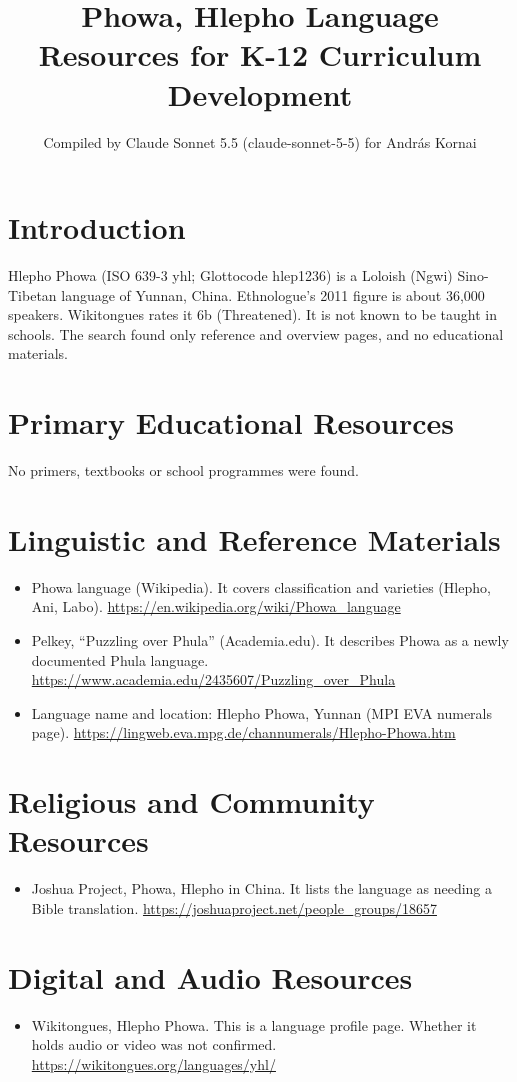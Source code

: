\documentclass[12pt]{article}
\title{Phowa, Hlepho Language Resources for K-12 Curriculum Development}
\author{Compiled by Claude Sonnet 5.5 (claude-sonnet-5-5) for Andr\'as Kornai}
\date{}
\begin{document}
\maketitle

\section{Introduction}
Hlepho Phowa (ISO 639-3 yhl; Glottocode hlep1236) is a Loloish (Ngwi) Sino-Tibetan language of Yunnan, China. Ethnologue's 2011 figure is about 36,000 speakers. Wikitongues rates it 6b (Threatened). It is not known to be taught in schools. The search found only reference and overview pages, and no educational materials.

\section{Primary Educational Resources}
No primers, textbooks or school programmes were found.

\section{Linguistic and Reference Materials}
\begin{itemize}
\item Phowa language (Wikipedia). It covers classification and varieties (Hlepho, Ani, Labo). \url{https://en.wikipedia.org/wiki/Phowa_language}
\item Pelkey, ``Puzzling over Phula'' (Academia.edu). It describes Phowa as a newly documented Phula language. \url{https://www.academia.edu/2435607/Puzzling_over_Phula}
\item Language name and location: Hlepho Phowa, Yunnan (MPI EVA numerals page). \url{https://lingweb.eva.mpg.de/channumerals/Hlepho-Phowa.htm}
\end{itemize}

\section{Religious and Community Resources}
\begin{itemize}
\item Joshua Project, Phowa, Hlepho in China. It lists the language as needing a Bible translation. \url{https://joshuaproject.net/people_groups/18657}
\end{itemize}

\section{Digital and Audio Resources}
\begin{itemize}
\item Wikitongues, Hlepho Phowa. This is a language profile page. Whether it holds audio or video was not confirmed. \url{https://wikitongues.org/languages/yhl/}
\end{itemize}
\end{document}
